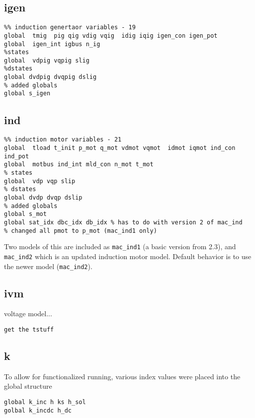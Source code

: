 \subsection{igen}
\begin{verbatim}
%% induction genertaor variables - 19
global  tmig  pig qig vdig vqig  idig iqig igen_con igen_pot
global  igen_int igbus n_ig
%states
global  vdpig vqpig slig
%dstates
global dvdpig dvqpig dslig
% added globals
global s_igen
\end{verbatim}


\subsection{ind}
\begin{verbatim}
%% induction motor variables - 21
global  tload t_init p_mot q_mot vdmot vqmot  idmot iqmot ind_con ind_pot
global  motbus ind_int mld_con n_mot t_mot
% states
global  vdp vqp slip
% dstates
global dvdp dvqp dslip
% added globals
global s_mot
global sat_idx dbc_idx db_idx % has to do with version 2 of mac_ind
% changed all pmot to p_mot (mac_ind1 only)
\end{verbatim}
Two models of this are included as \verb|mac_ind1| (a basic version from 2.3), and \verb|mac_ind2| which is an updated induction motor model. Default behavior is to use the newer model (\verb|mac_ind2|).

\subsection{ivm} 
voltage model...
\begin{verbatim}
get the tstuff
\end{verbatim}

\subsection{k}  
To allow for functionalized running, various index values were placed into the global structure

\begin{verbatim}
global k_inc h ks h_sol
golbal k_incdc h_dc
\end{verbatim}

